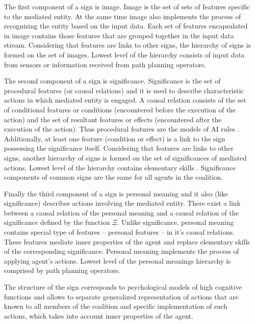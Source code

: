 \documentclass[runningheads,a4paper]{llncs}
\begin{document}
The first component of a sign is image. Image is the set of sets of features specific to the mediated entity. At the same time image also implements the process of recognizing the entity based on the input data. Each set of features encapsulated in image contains those features that are grouped together in the input data stream. Considering that features are links to other signs, the hierarchy of signs is formed on the set of images. Lowest level of the hierarchy consists of input data from sensors or information received from path planning operators.

The second component of a sign is significance. Significance is the set of procedural features (or causal relations) and it is used to describe characteristic actions in which mediated entity is engaged. A causal relation consists of the set of conditional features or conditions (encountered before the execution of the action) and the set of resultant features or effects (encountered after the execution of the action). Thus procedural features are the models of AI rules \cite{Nilsson1998}. Additionally, at least one feature (condition or effect) is a link to the sign possessing the significance itself. Considering that features are links to other signs, another hierarchy of signs is formed on the set of significances of mediated actions. Lowest level of the hierarchy contains elementary skills . Significance components of common signs are the same for all agents in the coalition.

Finally the third component of a sign is personal meaning and it also (like significance) describes actions involving the mediated entity. There exist a link between a causal relation of the personal meaning and a causal relation of the significance defined by the function $\Xi$. Unlike significance, personal meaning contains special type of features – personal features – in it's causal relations. These features mediate inner properties of the agent and replace elementary skills of the corresponding significance. Personal meaning implements the process of applying agent's actions. Lowest level of the personal meanings hierarchy is comprised by path planning operators. 

The structure of the sign corresponds to psychological models of high cognitive functions \cite{Vygotsky1986,Leontyev2009} and allows to separate generalized representation of actions that are known to all members of the coalition and specific implementation of such actions, which takes into account inner properties of the agent.
\end{document}

